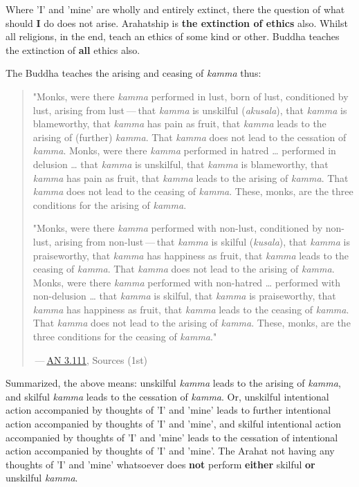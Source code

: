Where 'I' and 'mine' are wholly and entirely extinct, there the question of what should \textbf{I} do does not arise. Arahatship is \textbf{the extinction of ethics} also. Whilst all religions, in the end, teach an ethics of some kind or other. Buddha teaches the extinction of \textbf{all} ethics also.

The Buddha teaches the arising and ceasing of \emph{kamma} thus:

\begin{quote}
"Monks, were there \emph{kamma} performed in lust, born of lust, conditioned by lust, arising from lust --- that \emph{kamma} is unskilful (\emph{akusala}), that \emph{kamma} is blameworthy, that \emph{kamma} has pain as fruit, that \emph{kamma} leads to the arising of (further) \emph{kamma}. That \emph{kamma} does not lead to the cessation of \emph{kamma}. Monks, were there \emph{kamma} performed in hatred \ldots{} performed in delusion \ldots{} that \emph{kamma} is unskilful, that \emph{kamma} is blameworthy, that \emph{kamma} has pain as fruit, that \emph{kamma} leads to the arising of \emph{kamma}. That \emph{kamma} does not lead to the ceasing of \emph{kamma}. These, monks, are the three conditions for the arising of \emph{kamma}.

"Monks, were there \emph{kamma} performed with non-lust, conditioned by non-lust, arising from non-lust --- that \emph{kamma} is skilful (\emph{kusala}), that \emph{kamma} is praiseworthy, that \emph{kamma} has happiness as fruit, that \emph{kamma} leads to the ceasing of \emph{kamma}. That \emph{kamma} does not lead to the arising of \emph{kamma}. Monks, were there \emph{kamma} performed with non-hatred \ldots{} performed with non-delusion \ldots{} that \emph{kamma} is skilful, that \emph{kamma} is praiseworthy, that \emph{kamma} has happiness as fruit, that \emph{kamma} leads to the ceasing of \emph{kamma}. That \emph{kamma} does not lead to the arising of \emph{kamma}. These, monks, are the three conditions for the ceasing of \emph{kamma}."

 --- \href{https://suttacentral.net/an3.111/en/sujato}{AN 3.111}, Sources (1st)
\end{quote}

Summarized, the above means: unskilful \emph{kamma} leads to the arising of \emph{kamma}, and skilful \emph{kamma} leads to the cessation of \emph{kamma}. Or, unskilful intentional action accompanied by thoughts of 'I' and 'mine' leads to further intentional action accompanied by thoughts of 'I' and 'mine', and skilful intentional action accompanied by thoughts of 'I' and 'mine' leads to the cessation of intentional action accompanied by thoughts of 'I' and 'mine'. The Arahat not having any thoughts of 'I' and 'mine' whatsoever does \textbf{not} perform \textbf{either} skilful \textbf{or} unskilful \emph{kamma}.

